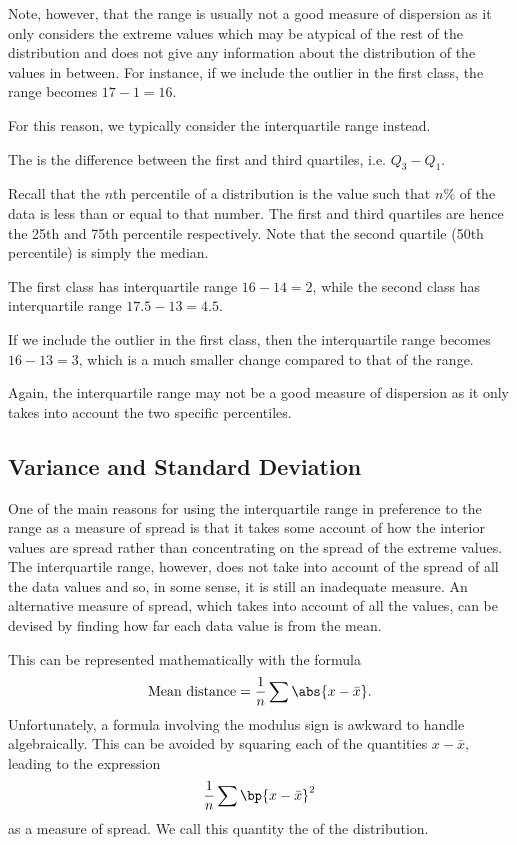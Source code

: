 Note, however, that the range is usually not a good measure of dispersion as it only considers the extreme values which may be atypical of the rest of the distribution and does not give any information about the distribution of the values in between. For instance, if we include the outlier in the first class, the range becomes $17 - 1 = 16$.

For this reason, we typically consider the interquartile range instead.

\begin{definition}
    The  is the difference between the first and third quartiles, i.e. $Q_3 - Q_1$.
\end{definition}

Recall that the $n$th percentile of a distribution is the value such that $n$\% of the data is less than or equal to that number. The first and third quartiles are hence the 25th and 75th percentile respectively. Note that the second quartile (50th percentile) is simply the median.

\begin{example}
    The first class has interquartile range $16 - 14 = 2$, while the second class has interquartile range $17.5 - 13 = 4.5$.
    
    If we include the outlier in the first class, then the interquartile range becomes $16 - 13 = 3$, which is a much smaller change compared to that of the range.
\end{example}

Again, the interquartile range may not be a good measure of dispersion as it only takes into account the two specific percentiles.

\subsection{Variance and Standard Deviation}

One of the main reasons for using the interquartile range in preference to the range as a measure of spread is that it takes some account of how the interior values are spread rather than concentrating on the spread of the extreme values. The interquartile range, however, does not take into account of the spread of all the data values and so, in some sense, it is still an inadequate measure. An alternative measure of spread, which takes into account of all the values, can be devised by finding how far each data value is from the mean.

This can be represented mathematically with the formula \[\text{Mean distance} = \frac1n \sum \abs{x - \bar x}.\] Unfortunately, a formula involving the modulus sign is awkward to handle algebraically. This can be avoided by squaring each of the quantities $x - \bar x$, leading to the expression \[\frac1n \sum \bp{x - \bar x}^2\] as a measure of spread. We call this quantity the  of the distribution.

